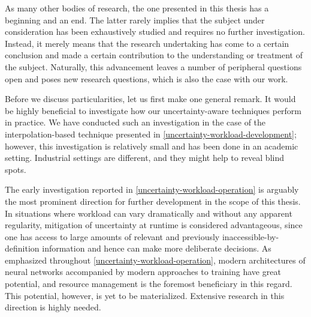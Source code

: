 As many other bodies of research, the one presented in this thesis has a
beginning and an end. The latter rarely implies that the subject under
consideration has been exhaustively studied and requires no further
investigation. Instead, it merely means that the research undertaking has come
to a certain conclusion and made a certain contribution to the understanding or
treatment of the subject. Naturally, this advancement leaves a number of
peripheral questions open and poses new research questions, which is also the
case with our work.

Before we discuss particularities, let us first make one general remark. It
would be highly beneficial to investigate how our uncertainty-aware techniques
perform in practice. We have conducted such an investigation in the case of the
interpolation-based technique presented in
\cref{uncertainty-workload-development}; however, this investigation is
relatively small and has been done in an academic setting. Industrial settings
are different, and they might help to reveal blind spots.

The early investigation reported in \cref{uncertainty-workload-operation} is
arguably the most prominent direction for further development in the scope of
this thesis. In situations where workload can vary dramatically and without any
apparent regularity, mitigation of uncertainty at runtime is considered
advantageous, since one has access to large amounts of relevant and previously
inaccessible-by-definition information and hence can make more deliberate
decisions. As emphasized throughout \cref{uncertainty-workload-operation},
modern architectures of neural networks accompanied by modern approaches to
training have great potential, and resource management is the foremost
beneficiary in this regard. This potential, however, is yet to be materialized.
Extensive research in this direction is highly needed.
